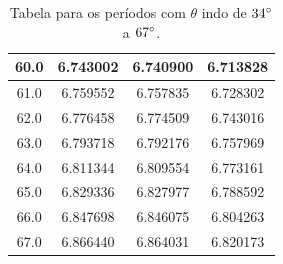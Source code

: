 \documentclass[12pt,a4paper]{article}
\begin{document}
\begin{table}[H]
\begin{center}
\begin{tabular}{|c|c|c|c|}
\hline
60.0 & 6.743002 & 6.740900 & 6.713828 \\
\hline
61.0 & 6.759552 & 6.757835 & 6.728302 \\
\hline
62.0 & 6.776458 & 6.774509 & 6.743016 \\
\hline
63.0 & 6.793718 & 6.792176 & 6.757969 \\
\hline
64.0 & 6.811344 & 6.809554 & 6.773161 \\
\hline
65.0 & 6.829336 & 6.827977 & 6.788592 \\
\hline
66.0 & 6.847698 & 6.846075 & 6.804263 \\
\hline
67.0 & 6.866440 & 6.864031 & 6.820173 \\
\hline
\end{tabular}
\end{center}
\caption{Tabela para os períodos com $\theta$ indo de $34\degree$ a $67\degree$.}
\end{table}
\newpage
\end{document}
